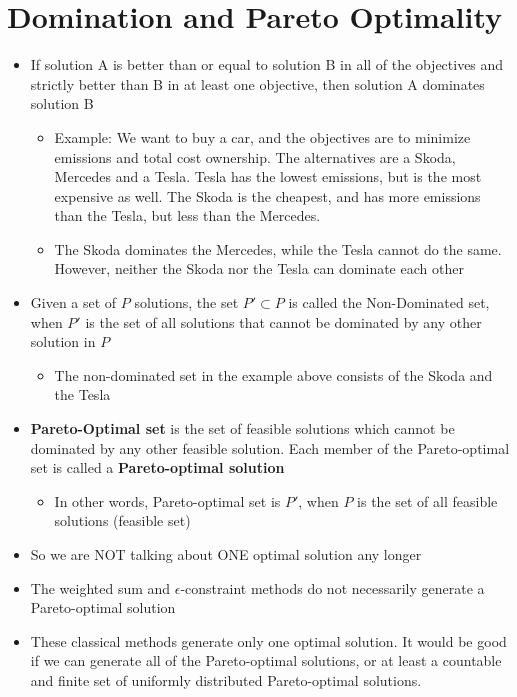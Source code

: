 \documentclass[10pt]{article}
\begin{document}
\section{Domination and Pareto Optimality}
\begin{itemize}
    \item If solution A is better than or equal to solution B in all of the objectives and strictly better than B in at least one objective, then solution A dominates solution B 
    \begin{itemize}
        \item Example: We want to buy a car, and the objectives are to minimize emissions and total cost ownership. The alternatives are a Skoda, Mercedes and a Tesla. Tesla has the lowest emissions, but is the most expensive as well. The Skoda is the cheapest, and has more emissions than the Tesla, but less than the Mercedes. 
        \item The Skoda dominates the Mercedes, while the Tesla cannot do the same. However, neither the Skoda nor the Tesla can dominate each other 
    \end{itemize}
    \item Given a set of $P $ solutions, the set $P'\subset P $ is called the Non-Dominated set, when $P' $ is the set of all solutions that cannot be dominated by any other solution in $P $
    \begin{itemize}
        \item The non-dominated set in the example above consists of the Skoda and the Tesla
    \end{itemize}
    \item \textbf{Pareto-Optimal set} is the set of feasible solutions which cannot be dominated by any other feasible solution. Each member of the Pareto-optimal set is called a \textbf{Pareto-optimal solution}
    \begin{itemize}
        \item In other words, Pareto-optimal set is $P' $, when $P $ is the set of all feasible solutions (feasible set)
    \end{itemize}
    \item So we are NOT talking about ONE optimal solution any longer 
    \item The weighted sum and $\epsilon $-constraint methods do not necessarily generate a Pareto-optimal solution
    \item These classical methods generate only one optimal solution. It would be good if we can generate all of the Pareto-optimal solutions, or at least a countable and finite set of uniformly distributed Pareto-optimal solutions. 
\end{itemize}
\end{document}
